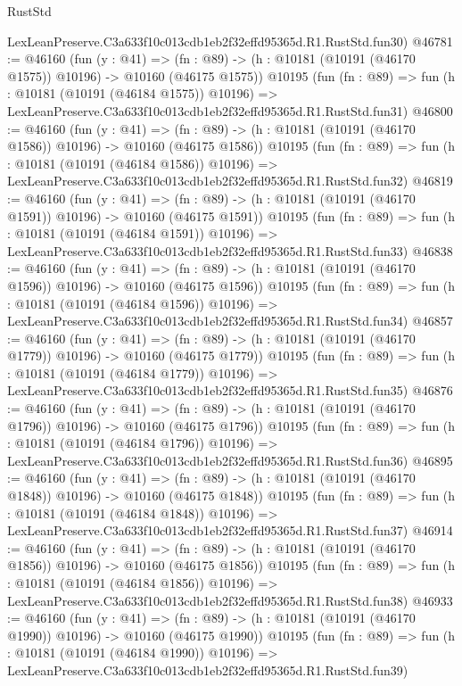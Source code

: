 \begin{lexlean}{RustStd}
\begin{coremodule}
    LexLeanPreserve.C3a633f10c013cdb1eb2f32effd95365d.R1.RustStd.fun30)
@46781 := @46160
    (fun (y : @41) =>
    (fn : @89) -> (h : @10181 (@10191 (@46170 @1575)) @10196) -> @10160 (@46175 @1575))
    @10195
    (fun (fn : @89) =>
    fun (h : @10181 (@10191 (@46184 @1575)) @10196) =>
    LexLeanPreserve.C3a633f10c013cdb1eb2f32effd95365d.R1.RustStd.fun31)
@46800 := @46160
    (fun (y : @41) =>
    (fn : @89) -> (h : @10181 (@10191 (@46170 @1586)) @10196) -> @10160 (@46175 @1586))
    @10195
    (fun (fn : @89) =>
    fun (h : @10181 (@10191 (@46184 @1586)) @10196) =>
    LexLeanPreserve.C3a633f10c013cdb1eb2f32effd95365d.R1.RustStd.fun32)
@46819 := @46160
    (fun (y : @41) =>
    (fn : @89) -> (h : @10181 (@10191 (@46170 @1591)) @10196) -> @10160 (@46175 @1591))
    @10195
    (fun (fn : @89) =>
    fun (h : @10181 (@10191 (@46184 @1591)) @10196) =>
    LexLeanPreserve.C3a633f10c013cdb1eb2f32effd95365d.R1.RustStd.fun33)
@46838 := @46160
    (fun (y : @41) =>
    (fn : @89) -> (h : @10181 (@10191 (@46170 @1596)) @10196) -> @10160 (@46175 @1596))
    @10195
    (fun (fn : @89) =>
    fun (h : @10181 (@10191 (@46184 @1596)) @10196) =>
    LexLeanPreserve.C3a633f10c013cdb1eb2f32effd95365d.R1.RustStd.fun34)
@46857 := @46160
    (fun (y : @41) =>
    (fn : @89) -> (h : @10181 (@10191 (@46170 @1779)) @10196) -> @10160 (@46175 @1779))
    @10195
    (fun (fn : @89) =>
    fun (h : @10181 (@10191 (@46184 @1779)) @10196) =>
    LexLeanPreserve.C3a633f10c013cdb1eb2f32effd95365d.R1.RustStd.fun35)
@46876 := @46160
    (fun (y : @41) =>
    (fn : @89) -> (h : @10181 (@10191 (@46170 @1796)) @10196) -> @10160 (@46175 @1796))
    @10195
    (fun (fn : @89) =>
    fun (h : @10181 (@10191 (@46184 @1796)) @10196) =>
    LexLeanPreserve.C3a633f10c013cdb1eb2f32effd95365d.R1.RustStd.fun36)
@46895 := @46160
    (fun (y : @41) =>
    (fn : @89) -> (h : @10181 (@10191 (@46170 @1848)) @10196) -> @10160 (@46175 @1848))
    @10195
    (fun (fn : @89) =>
    fun (h : @10181 (@10191 (@46184 @1848)) @10196) =>
    LexLeanPreserve.C3a633f10c013cdb1eb2f32effd95365d.R1.RustStd.fun37)
@46914 := @46160
    (fun (y : @41) =>
    (fn : @89) -> (h : @10181 (@10191 (@46170 @1856)) @10196) -> @10160 (@46175 @1856))
    @10195
    (fun (fn : @89) =>
    fun (h : @10181 (@10191 (@46184 @1856)) @10196) =>
    LexLeanPreserve.C3a633f10c013cdb1eb2f32effd95365d.R1.RustStd.fun38)
@46933 := @46160
    (fun (y : @41) =>
    (fn : @89) -> (h : @10181 (@10191 (@46170 @1990)) @10196) -> @10160 (@46175 @1990))
    @10195
    (fun (fn : @89) =>
    fun (h : @10181 (@10191 (@46184 @1990)) @10196) =>
    LexLeanPreserve.C3a633f10c013cdb1eb2f32effd95365d.R1.RustStd.fun39)

\end{coremodule}
\end{lexlean}
